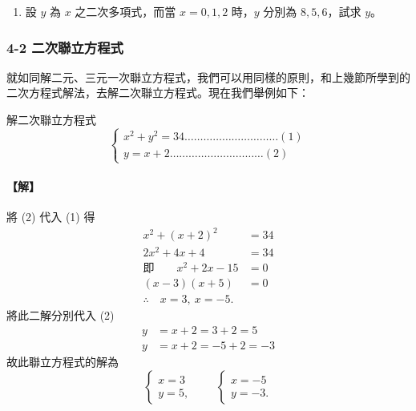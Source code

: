 \begin{enumerate}
\begin{figure}[htbp]
  \caption{正三角形與正方形幾何配置圖}
  \label{fig:triangle_square}
  \end{figure}

  \item 設 $y$ 為 $x$ 之二次多項式，而當 $x=0, 1, 2$ 時，$y$ 分別為 $8, 5, 6$，試求 $y$。
\end{enumerate}

\subsubsection*{4-2 二次聯立方程式}

就如同解二元、三元一次聯立方程式，我們可以用同樣的原則，和上幾節所學到的二次方程式解法，去解二次聯立方程式。現在我們舉例如下：

\begin{example}\label{ex:b2_1-4-4}
解二次聯立方程式
\[
\begin{cases}
x^2+y^2=34 \dots\dots\dots\dots\dots\dots\dots\dots\dots\dots (1) \\
y=x+2 \dots\dots\dots\dots\dots\dots\dots\dots\dots\dots (2)
\end{cases}
\]
\end{example}
\paragraph{【解】}
將 (2) 代入 (1) 得
\begin{align*}
x^2+(x+2)^2 &= 34 \\
2x^2+4x+4 &= 34 \\
\text{即}\qquad x^2+2x-15 &= 0 \\
(x-3)(x+5) &= 0 \\
\therefore\quad x=3,\ x=-5.
\end{align*}
將此二解分別代入 (2)
\begin{align*}
y &= x+2 = 3+2=5 \\
y &= x+2 = -5+2=-3
\end{align*}
故此聯立方程式的解為
\[
\begin{cases} x=3 \\ y=5, \end{cases}\qquad
\begin{cases} x=-5 \\ y=-3. \end{cases}
\]


